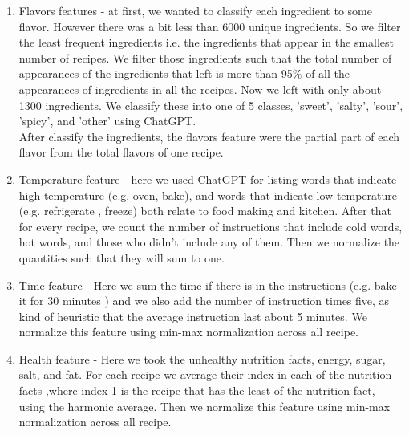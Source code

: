 \documentclass[]{article}
\begin{document}
\begin{enumerate}
	\item Flavors features - at first, we wanted to classify each ingredient to some flavor. However there was a bit less than 6000 unique ingredients. So we filter the least frequent ingredients i.e. the ingredients that appear in the smallest number of recipes. We filter those ingredients such that the total number of appearances of the ingredients that left is more than 95\% of all the appearances of ingredients in all the recipes. Now we left with only about 1300 ingredients. We classify these into one of 5 classes, 'sweet', 'salty', 'sour', 'spicy', and 'other' using ChatGPT.\\
	After classify the ingredients, the flavors feature were the partial part of each flavor from the total flavors of one recipe.
	\item Temperature feature - here we used ChatGPT for listing words that indicate high temperature (e.g. oven, bake), and words that indicate low temperature (e.g. refrigerate , freeze) both relate to food making and kitchen. After that for every recipe, we count the number of instructions that include cold words, hot words, and those who didn't include any of them. Then we normalize the quantities such that they will sum to one.
	\item Time feature - Here we sum the time if there is in the instructions (e.g. bake it for 30 minutes ) and we also add the number of instruction times five, as kind of heuristic that the average instruction last about 5 minutes. We normalize this feature using min-max normalization across all recipe. 
	\item Health feature - Here we took the unhealthy nutrition facts, energy, sugar, salt, and fat. For each recipe we average their index in each of the nutrition facts ,where index 1 is the recipe that has the least of the nutrition fact, using the harmonic average. Then we normalize this feature using min-max normalization across all recipe. 
\end{enumerate}

\pagebreak


\end{document}
